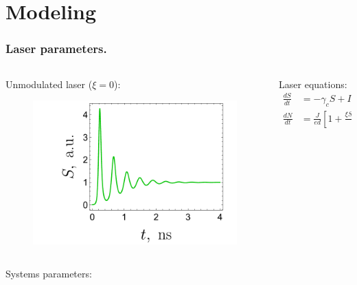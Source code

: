 \section{Modeling}

\begin{frame}
	\frametitle{Laser parameters.}
	\begin{columns}
		\begin{column}{.4\linewidth}
			Unmodulated laser ($\xi = 0$):
		\begin{figure}
				\centering
				\includegraphics[width=\linewidth]{figures/laser_classic.pdf}
		\end{figure}
		
		\end{column}
		\begin{column}{.6\linewidth}
			Laser equations:
			\begin{align*}
				\frac{d S}{d t}&=-\gamma_{c} S+\Gamma g S \\
				\frac{d N}{d t}&=\frac{J}{e d}\left[1+\frac{\xi S(t-\tau)}{S_{0}}\right]-\gamma_{s} N-g S
			\end{align*}
		\end{column}
	\end{columns}

	Systems parameters:
	\begin{itemize}
	\end{itemize}
	
\end{frame}

